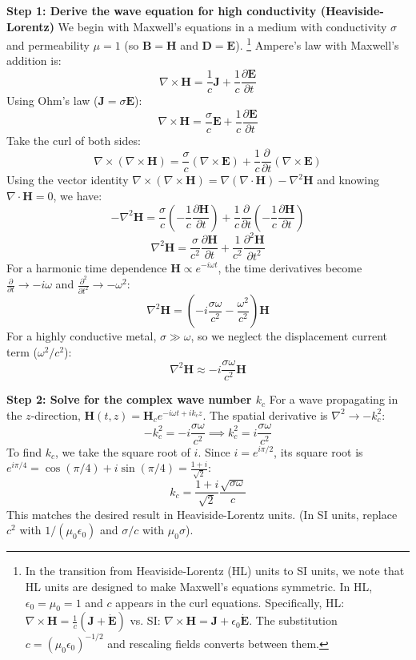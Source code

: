 \begin{solution}
\textbf{Step 1: Derive the wave equation for high conductivity (Heaviside-Lorentz)}
We begin with Maxwell's equations in a medium with conductivity $\sigma$ and permeability $\mu = 1$ (so $\mathbf{B} = \mathbf{H}$ and $\mathbf{D} = \mathbf{E}$).
\footnote{In the transition from Heaviside-Lorentz (HL) units to SI units, we note that HL units are designed to make Maxwell's equations symmetric. In HL, $\epsilon_0 = \mu_0 = 1$ and $c$ appears in the curl equations. Specifically, HL: $\nabla \times \mathbf{H} = \frac{1}{c}(\mathbf{J} + \dot{\mathbf{E}})$ vs. SI: $\nabla \times \mathbf{H} = \mathbf{J} + \epsilon_0 \dot{\mathbf{E}}$. The substitution $c = (\mu_0 \epsilon_0)^{-1/2}$ and rescaling fields converts between them.}
Ampere's law with Maxwell's addition is:
\[ \nabla \times \mathbf{H} = \frac{1}{c} \mathbf{J} + \frac{1}{c} \frac{\partial \mathbf{E}}{\partial t} \]
Using Ohm's law ($\mathbf{J} = \sigma \mathbf{E}$):
\[ \nabla \times \mathbf{H} = \frac{\sigma}{c} \mathbf{E} + \frac{1}{c} \frac{\partial \mathbf{E}}{\partial t} \]
Take the curl of both sides:
\[ \nabla \times (\nabla \times \mathbf{H}) = \frac{\sigma}{c} (\nabla \times \mathbf{E}) + \frac{1}{c} \frac{\partial}{\partial t} (\nabla \times \mathbf{E}) \]
Using the vector identity $\nabla \times (\nabla \times \mathbf{H}) = \nabla(\nabla \cdot \mathbf{H}) - \nabla^2 \mathbf{H}$ and knowing $\nabla \cdot \mathbf{H} = 0$, we have:
\[ -\nabla^2 \mathbf{H} = \frac{\sigma}{c} \left( -\frac{1}{c} \frac{\partial \mathbf{H}}{\partial t} \right) + \frac{1}{c} \frac{\partial}{\partial t} \left( -\frac{1}{c} \frac{\partial \mathbf{H}}{\partial t} \right) \]
\[ \nabla^2 \mathbf{H} = \frac{\sigma}{c^2} \frac{\partial \mathbf{H}}{\partial t} + \frac{1}{c^2} \frac{\partial^2 \mathbf{H}}{\partial t^2} \]
For a harmonic time dependence $\mathbf{H} \propto e^{-i\omega t}$, the time derivatives become $\frac{\partial}{\partial t} \to -i\omega$ and $\frac{\partial^2}{\partial t^2} \to -\omega^2$:
\[ \nabla^2 \mathbf{H} = \left( -i\frac{\sigma \omega}{c^2} - \frac{\omega^2}{c^2} \right) \mathbf{H} \]
For a highly conductive metal, $\sigma \gg \omega$, so we neglect the displacement current term ($\omega^2/c^2$):
\[ \nabla^2 \mathbf{H} \approx -i\frac{\sigma \omega}{c^2} \mathbf{H} \]

\textbf{Step 2: Solve for the complex wave number $k_c$}
For a wave propagating in the $z$-direction, $\mathbf{H}(t,z) = \mathbf{H}_c e^{-i\omega t + i k_c z}$. The spatial derivative is $\nabla^2 \to -k_c^2$:
\[ -k_c^2 = -i\frac{\sigma \omega}{c^2} \implies k_c^2 = i\frac{\sigma \omega}{c^2} \]
To find $k_c$, we take the square root of $i$. Since $i = e^{i\pi/2}$, its square root is $e^{i\pi/4} = \cos(\pi/4) + i\sin(\pi/4) = \frac{1+i}{\sqrt{2}}$:
\[ k_c = \frac{1+i}{\sqrt{2}} \frac{\sqrt{\sigma \omega}}{c} \]
This matches the desired result in Heaviside-Lorentz units. (In SI units, replace $c^2$ with $1/(\mu_0 \epsilon_0)$ and $\sigma/c$ with $\mu_0 \sigma$).


\end{solution}
